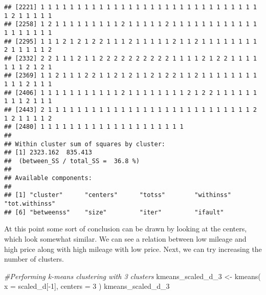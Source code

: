 \documentclass[
]{article}
\newenvironment{Shaded}{\begin{snugshade}}{\end{snugshade}}
\newcommand{\AttributeTok}[1]{\textcolor[rgb]{0.77,0.63,0.00}{#1}}
\newcommand{\CommentTok}[1]{\textcolor[rgb]{0.56,0.35,0.01}{\textit{#1}}}
\newcommand{\DecValTok}[1]{\textcolor[rgb]{0.00,0.00,0.81}{#1}}
\newcommand{\FunctionTok}[1]{\textcolor[rgb]{0.00,0.00,0.00}{#1}}
\newcommand{\NormalTok}[1]{#1}
\newcommand{\OtherTok}[1]{\textcolor[rgb]{0.56,0.35,0.01}{#1}}
\newcommand{\SpecialCharTok}[1]{\textcolor[rgb]{0.00,0.00,0.00}{#1}}
\begin{document}
\begin{verbatim}
## [2221] 1 1 1 1 1 1 1 1 1 1 1 1 1 1 1 1 1 1 1 1 1 1 1 1 1 1 1 1 1 1 1 2 1 1 1 1 1
## [2258] 1 2 1 1 1 1 1 1 1 1 1 2 1 1 1 1 1 2 1 1 1 1 1 1 1 1 1 1 1 1 1 1 1 1 1 1 1
## [2295] 1 1 1 2 1 2 1 2 2 1 1 1 2 1 1 1 1 1 2 1 1 2 1 1 1 1 1 1 1 1 2 1 1 1 1 1 2
## [2332] 2 2 1 1 1 2 1 1 2 2 2 2 2 2 2 2 2 2 1 1 1 1 2 1 2 2 1 1 1 1 1 1 1 2 1 2 1
## [2369] 1 1 2 1 1 1 2 2 1 1 2 1 2 1 1 2 1 2 2 1 1 2 1 1 1 1 1 1 1 1 1 1 1 2 1 1 1
## [2406] 1 1 1 1 1 1 1 1 1 1 1 2 1 1 1 1 1 1 1 1 2 1 2 2 1 1 1 1 1 1 1 1 1 2 1 1 1
## [2443] 2 1 1 1 1 1 1 1 1 1 1 1 1 1 1 1 1 1 1 1 1 1 1 1 1 1 1 1 1 2 1 2 1 1 1 1 2
## [2480] 1 1 1 1 1 1 1 1 1 1 1 1 1 1 1 1 1 1 1 1
## 
## Within cluster sum of squares by cluster:
## [1] 2323.162  835.413
##  (between_SS / total_SS =  36.8 %)
## 
## Available components:
## 
## [1] "cluster"      "centers"      "totss"        "withinss"     "tot.withinss"
## [6] "betweenss"    "size"         "iter"         "ifault"
\end{verbatim}

At this point some sort of conclusion can be drawn by looking at the
centers, which look somewhat similar. We can see a relation between low
mileage and high price along with high mileage with low price. Next, we
can try increasing the number of clusters.

\begin{Shaded}
\begin{Highlighting}[]
\CommentTok{\#Performing k{-}means clustering with 3 clusters}
\NormalTok{kmeans\_scaled\_d\_3 }\OtherTok{\textless{}{-}} \FunctionTok{kmeans}\NormalTok{(}
  \AttributeTok{x =}\NormalTok{ scaled\_d[}\SpecialCharTok{{-}}\DecValTok{1}\NormalTok{],}
  \AttributeTok{centers =} \DecValTok{3}
\NormalTok{)}
\NormalTok{kmeans\_scaled\_d\_3}
\end{Highlighting}
\end{Shaded}
\end{document}
